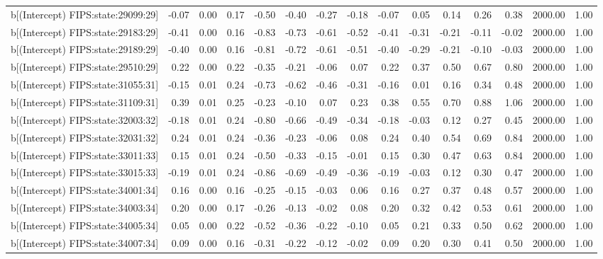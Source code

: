 \begin{table}[ht]
\begin{tabular}{rrrrrrrrrrrrrrr}
  b[(Intercept) FIPS:state:29099:29] & -0.07 & 0.00 & 0.17 & -0.50 & -0.40 & -0.27 & -0.18 & -0.07 & 0.05 & 0.14 & 0.26 & 0.38 & 2000.00 & 1.00 \\ 
  b[(Intercept) FIPS:state:29183:29] & -0.41 & 0.00 & 0.16 & -0.83 & -0.73 & -0.61 & -0.52 & -0.41 & -0.31 & -0.21 & -0.11 & -0.02 & 2000.00 & 1.00 \\ 
  b[(Intercept) FIPS:state:29189:29] & -0.40 & 0.00 & 0.16 & -0.81 & -0.72 & -0.61 & -0.51 & -0.40 & -0.29 & -0.21 & -0.10 & -0.03 & 2000.00 & 1.00 \\ 
  b[(Intercept) FIPS:state:29510:29] & 0.22 & 0.00 & 0.22 & -0.35 & -0.21 & -0.06 & 0.07 & 0.22 & 0.37 & 0.50 & 0.67 & 0.80 & 2000.00 & 1.00 \\ 
  b[(Intercept) FIPS:state:31055:31] & -0.15 & 0.01 & 0.24 & -0.73 & -0.62 & -0.46 & -0.31 & -0.16 & 0.01 & 0.16 & 0.34 & 0.48 & 2000.00 & 1.00 \\ 
  b[(Intercept) FIPS:state:31109:31] & 0.39 & 0.01 & 0.25 & -0.23 & -0.10 & 0.07 & 0.23 & 0.38 & 0.55 & 0.70 & 0.88 & 1.06 & 2000.00 & 1.00 \\ 
  b[(Intercept) FIPS:state:32003:32] & -0.18 & 0.01 & 0.24 & -0.80 & -0.66 & -0.49 & -0.34 & -0.18 & -0.03 & 0.12 & 0.27 & 0.45 & 2000.00 & 1.00 \\ 
  b[(Intercept) FIPS:state:32031:32] & 0.24 & 0.01 & 0.24 & -0.36 & -0.23 & -0.06 & 0.08 & 0.24 & 0.40 & 0.54 & 0.69 & 0.84 & 2000.00 & 1.00 \\ 
  b[(Intercept) FIPS:state:33011:33] & 0.15 & 0.01 & 0.24 & -0.50 & -0.33 & -0.15 & -0.01 & 0.15 & 0.30 & 0.47 & 0.63 & 0.84 & 2000.00 & 1.00 \\ 
  b[(Intercept) FIPS:state:33015:33] & -0.19 & 0.01 & 0.24 & -0.86 & -0.69 & -0.49 & -0.36 & -0.19 & -0.03 & 0.12 & 0.30 & 0.47 & 2000.00 & 1.00 \\ 
  b[(Intercept) FIPS:state:34001:34] & 0.16 & 0.00 & 0.16 & -0.25 & -0.15 & -0.03 & 0.06 & 0.16 & 0.27 & 0.37 & 0.48 & 0.57 & 2000.00 & 1.00 \\ 
  b[(Intercept) FIPS:state:34003:34] & 0.20 & 0.00 & 0.17 & -0.26 & -0.13 & -0.02 & 0.08 & 0.20 & 0.32 & 0.42 & 0.53 & 0.61 & 2000.00 & 1.00 \\ 
  b[(Intercept) FIPS:state:34005:34] & 0.05 & 0.00 & 0.22 & -0.52 & -0.36 & -0.22 & -0.10 & 0.05 & 0.21 & 0.33 & 0.50 & 0.62 & 2000.00 & 1.00 \\ 
  b[(Intercept) FIPS:state:34007:34] & 0.09 & 0.00 & 0.16 & -0.31 & -0.22 & -0.12 & -0.02 & 0.09 & 0.20 & 0.30 & 0.41 & 0.50 & 2000.00 & 1.00 \\ 

\end{tabular}
\end{table}
